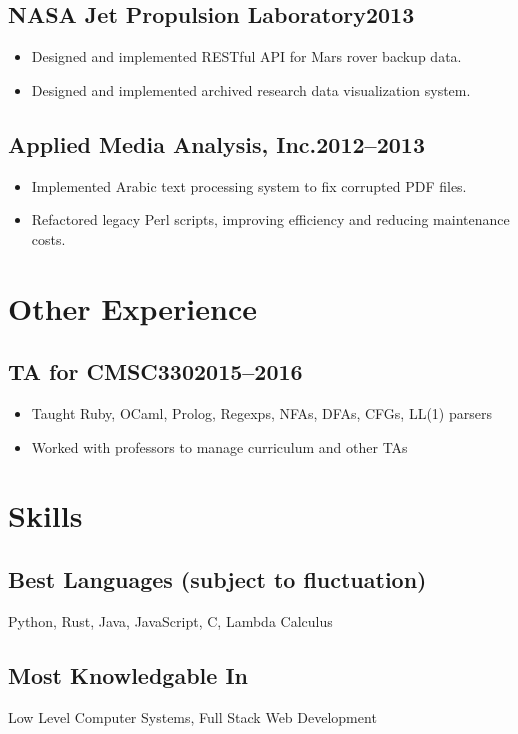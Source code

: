\documentclass[letterpaper]{article}
\newcommand{\subsectiondate}[2]{\subsection*{#1\hfill#2}}
\begin{document}
\subsectiondate{NASA Jet Propulsion Laboratory}{2013}

\begin{itemize}
    \item Designed and implemented RESTful API for Mars rover backup data.
    \item Designed and implemented archived research data visualization system.
\end{itemize}

\subsectiondate{Applied Media Analysis, Inc.}{2012--2013}

\begin{itemize}
    \item Implemented Arabic text processing system to fix corrupted PDF files.
    \item Refactored legacy Perl scripts, improving efficiency and reducing maintenance costs.
\end{itemize}


\section*{Other Experience}

\subsectiondate{TA for CMSC330}{2015--2016}

\begin{itemize}
    \item Taught Ruby, OCaml, Prolog, Regexps, NFAs, DFAs, CFGs, LL(1) parsers
    \item Worked with professors to manage curriculum and other TAs
\end{itemize}

\section*{Skills}

\subsection*{Best Languages (subject to fluctuation)}
Python, Rust, Java, JavaScript, C, Lambda Calculus

\subsection*{Most Knowledgable In}
Low Level Computer Systems, Full Stack Web Development
\end{document}
